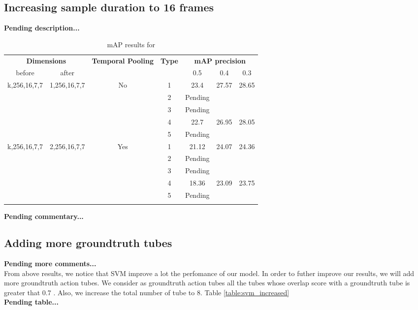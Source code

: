 \subsection{Increasing sample duration to 16 frames}

\textbf{Pending description...}
\begin{center}
\begin{longtable}{||c | c| c| c||c c c||}

  \hline
 \multicolumn{2}{||c|}{\textbf{Dimensions}} & \multirow{2}{4.5em}{\textbf{Temporal Pooling}} &\multirow{2}{*}{ \textbf{Type}} &\multicolumn{3}{|c||}{\textbf{mAP precision}}\\

  before & after & {} & {} &  0.5 &  0.4 & 0.3 \\
  \hline   \hline

  \multirow{5}{*}{k,256,16,7,7} & \multirow{5}{*}{1,256,16,7,7} & \multirow{5}{*}{No}  & 1 & 23.4 & 27.57 &28.65  \\
  \cline{4-7}

  {} & {} & {} & 2 & Pending \\
  \cline{4-7}
  {} & {} & {} & 3 & Pending \\
  \cline{4-7}
  {} & {} & {} & 4 & 22.7 & 26.95 & 28.05 \\
  \cline{4-7}
  {} & {} & {} & 5 & Pending \\
  \hline

  \multirow{5}{*}{k,256,16,7,7} & \multirow{5}{*}{2,256,16,7,7} & \multirow{5}{*}{Yes}  & 1 & 21.12 & 24.07 & 24.36  \\
  \cline{4-7}

  {} & {} & {} & 2 & Pending \\
  \cline{4-7}
  {} & {} & {} & 3 & Pending \\
  \cline{4-7}
  {} & {} & {} & 4 & 18.36 & 23.09 & 23.75 \\
  \cline{4-7}
  
  {} & {} & {} & 5 & Pending \\
  \hline
  \caption{mAP results for   }
  \label{table:svm_temp_pooling_16}
\end{longtable} 
\end{center}

\textbf{Pending commentary...}

\subsection{Adding more groundtruth tubes}
\textbf{Pending more comments...} \\
From above results, we notice that SVM improve a lot the perfomance of our model. In order to futher improve our results, we will
add more groundtruth action tubes. We consider as groundtruth action tubes all the tubes whose overlap score  with a groundtruth tube is
greater that 0.7 . Also, we increase the total number of tube to 8. Table \ref{table:svm_increased}
\\
\textbf{Pending table...}

